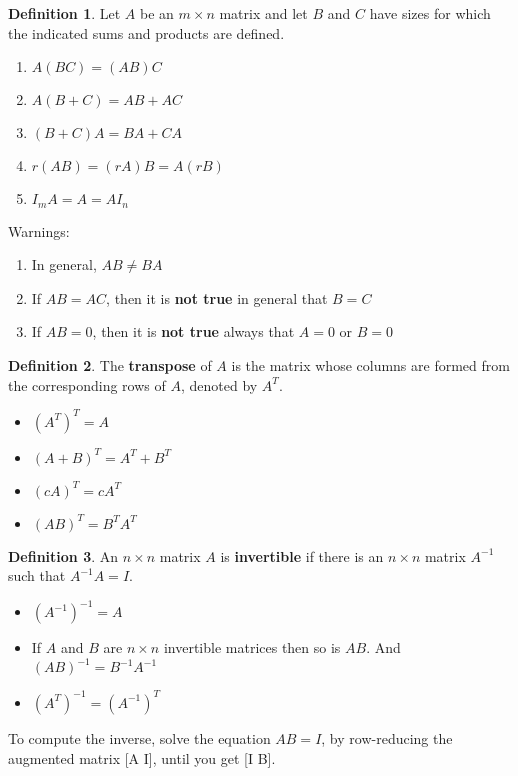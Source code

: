 \documentclass[letterpaper]{article}
\theoremstyle{definition}
\newtheorem{definition}{Definition}[section]
\begin{document}
\begin{definition}
Let $A$ be an $m \times n$ matrix and let $B$ and $C$ have sizes for which the indicated sums and products are defined. 
\begin{enumerate}
	\item $A(BC) = (AB)C$
	\item $A(B + C) = AB + AC$
	\item $(B + C)A = BA + CA $
	\item $r(AB) = (rA)B = A(rB)$
	\item $I_m A = A = AI_n$
\end{enumerate}
Warnings: 
\begin{enumerate}
	\item In general, $AB \neq BA$ 
	\item If $AB = AC$, then it is \textbf{not true} in general that $B=C$
	\item If $AB = 0$, then it is \textbf{not true} always that $A=0$ or $B=0$
\end{enumerate}
\end{definition}

\begin{definition}
The \textbf{transpose} of $A$ is the matrix whose columns are formed from the corresponding rows of $A$, denoted by $A^T$. 
\begin{itemize}
	\item $(A^T)^T = A$
	\item $(A + B)^T = A^T + B^T$
	\item $(cA)^T = cA^T$
	\item $(AB)^T = B^T A^T$
\end{itemize}
\end{definition}

\begin{definition}
An $n \times n$ matrix $A$ is \textbf{invertible} if there is an $n \times n$ matrix $A^{-1}$ such that $A^{-1}A = I$. 
\begin{itemize}
	\item $(A^{-1})^{-1} = A$
	\item If $A$ and $B$ are $n \times n$ invertible matrices then so is $AB$. And $(AB)^{-1} = B^{-1}A^{-1}$
	\item $(A^T)^{-1} = (A^{-1})^T$
\end{itemize}
To compute the inverse, solve the equation  $AB = I$, by row-reducing the augmented matrix [A  I], until you get [I  B]. 
\end{definition}
\end{document}
